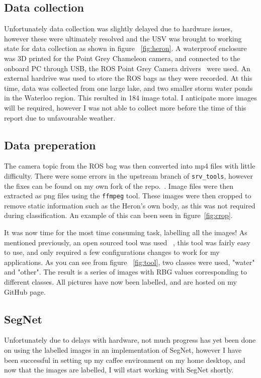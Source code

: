 \documentclass[10pt,twocolumn,letterpaper]{article}
\begin{document}
\subsection{Data collection}
Unfortunately data collection was slightly delayed due to hardware issues, however these were
ultimately resolved and the USV was brought to working state for data collection as shown in figure 
~\ref{fig:heron}. A waterproof enclosure was 3D printed for the Point Grey Chameleon camera, and connected
to the onboard PC through USB, the ROS Point Grey Camera drivers~\cite{PointGreyDrivers} were used. An
external hardrive was used to store the ROS bags as they were recorded. At this time, data was collected from
one large lake, and two smaller storm water ponds in the Waterloo region. This resulted in 184 image total.
I anticipate more images will be required, however I was not able to collect more before the time of this
report due to unfavourable weather. 

\subsection{Data preperation}
The camera topic from the ROS bag was then converted into mp4 files with little difficulty. There were some
errors in the upstream branch of \verb|srv_tools|, however the fixes can be found on my own fork of the
 repo.~\cite{srvtoolsfork}. Image files were then extracted as png files using the \verb|ffmpeg| tool. 
 These images were then cropped to remove static information such as the Heron's own body, as this was not
 required during classification. An example of this can been seen in figure~\ref{fig:crop}.

It was now time for the most time consuming task, labelling all the images! As mentioned previously, an
open sourced tool was used ~\cite{tangseng2017looking}, this tool was fairly easy to use, and only required
a few configurations changes to work for my applications. As you can see from figure ~\ref{fig:tool}, two
classes were used, "water" and "other". The result is a series of images with RBG values corresponding to
different classes. All pictures have now been labelled, and are hosted on my GitHub page.

\subsection{SegNet}
Unfortunately due to delays with hardware, not much progress has yet been done on using the labelled images
in an implementation of SegNet, however I have been successful in setting up my caffee environment on my
home desktop, and now that the images are labelled, I will start working with SegNet shortly.
\end{document}

